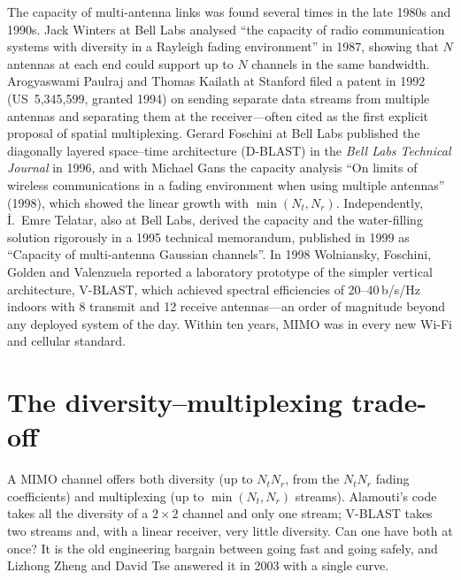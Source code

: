 \begin{history}
The capacity of multi-antenna links was found several times in the late 1980s and 1990s. Jack
Winters at Bell Labs analysed ``the capacity of radio communication systems with diversity in a
Rayleigh fading environment'' in 1987, showing that $N$ antennas at each end could support up to
$N$ channels in the same bandwidth. Arogyaswami Paulraj and Thomas Kailath at Stanford filed a
patent in 1992 (US~5,345,599, granted 1994) on sending separate data streams from multiple
antennas and separating them at the receiver---often cited as the first explicit proposal of
spatial multiplexing. Gerard Foschini at Bell Labs published the diagonally layered space--time
architecture (D-BLAST) in the \emph{Bell Labs Technical Journal} in 1996, and with Michael Gans the
capacity analysis ``On limits of wireless communications in a fading environment when using
multiple antennas'' (1998), which showed the linear growth with $\min(N_t,N_r)$. Independently,
\.{I}.~Emre Telatar, also at Bell Labs, derived the capacity and the water-filling solution
rigorously in a 1995 technical memorandum, published in 1999 as ``Capacity of multi-antenna
Gaussian channels''. In 1998 Wolniansky, Foschini, Golden and Valenzuela reported a laboratory
prototype of the simpler vertical architecture, V-BLAST, which achieved spectral efficiencies of
20--40\,b/s/Hz indoors with 8 transmit and 12 receive antennas---an order of magnitude beyond any
deployed system of the day. Within ten years, MIMO was in every new Wi-Fi and cellular standard.
\end{history}

\section{The diversity--multiplexing trade-off}
\label{sec:ch19:dmt}

A MIMO channel offers both diversity (up to $N_tN_r$, from the $N_tN_r$ fading coefficients) and
multiplexing (up to $\min(N_t,N_r)$ streams). Alamouti's code takes all the diversity of a
$2\times2$ channel and only one stream; V-BLAST takes two streams and, with a linear receiver, very
little diversity. Can one have both at once? It is the old engineering bargain between going fast
and going safely, and Lizhong Zheng and David Tse answered it in 2003 with a single curve.

